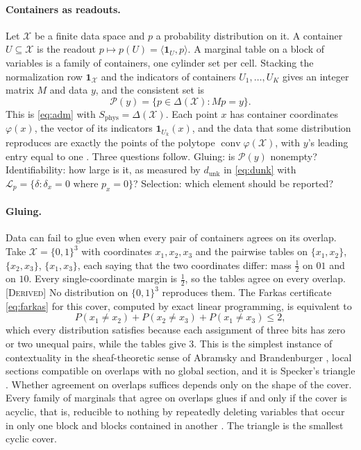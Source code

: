 \documentclass[11pt]{article}
\theoremstyle{boldplain}
\theoremstyle{boldupright}
\newcommand{\derived}{[\textup{\textsc{Derived}}]}
\newcommand{\Xs}{\mathcal{X}}
\newcommand{\Pc}{\mathcal{P}}
\newcommand{\one}{\mathbf{1}}
\newcommand{\dunk}{d_{\mathrm{unk}}}
\newcommand{\Sphys}{S_{\mathrm{phys}}}
\begin{document}
\paragraph{Containers as readouts.} Let $\Xs$ be a finite data space and $p$ a probability distribution on it. A
container $U\subseteq\Xs$ is the readout $p\mapsto p(U)=\langle\one_U,p\rangle$. A marginal table on a block of variables is a family
of containers, one cylinder set per cell. Stacking the normalization row $\one_{\Xs}$ and the indicators of containers
$U_1,\dots,U_K$ gives an integer matrix $M$ and data $y$, and the consistent set is
\begin{equation}\label{eq:fiber}
\Pc(y)=\{p\in\Delta(\Xs):Mp=y\}.
\end{equation}
This is \eqref{eq:adm} with $\Sphys=\Delta(\Xs)$. Each point $x$ has container coordinates $\varphi(x)$, the vector of its
indicators $\one_{U_k}(x)$, and the data that some distribution reproduces are exactly the points of the polytope $\operatorname{conv}\varphi(\Xs)$, with
$y$'s leading entry equal to one \cite{wainwright2008}. Three questions follow. Gluing: is $\Pc(y)$ nonempty? Identifiability:
how large is it, as measured by $\dunk$ in \eqref{eq:dunk} with $\mathcal{L}_p=\{\delta:\delta_x=0\text{ where }p_x=0\}$? Selection: which element
should be reported?

\paragraph{Gluing.} Data can fail to glue even when every pair of containers agrees on its overlap. Take
$\Xs=\{0,1\}^3$ with coordinates $x_1,x_2,x_3$ and the pairwise tables on $\{x_1,x_2\}$, $\{x_2,x_3\}$, $\{x_1,x_3\}$, each saying
that the two coordinates differ: mass $\tfrac12$ on $01$ and on $10$. Every single-coordinate margin is $\tfrac12$, so the
tables agree on every overlap. \derived{} No distribution on $\{0,1\}^3$ reproduces them. The Farkas
certificate \eqref{eq:farkas} for this cover, computed by exact linear programming, is equivalent to
\begin{equation}\label{eq:bell}
P(x_1\neq x_2)+P(x_2\neq x_3)+P(x_1\neq x_3)\le2,
\end{equation}
which every distribution satisfies because each assignment of three bits has zero or two unequal
pairs, while the tables give $3$. This is the simplest instance of contextuality in the sheaf-theoretic
sense of Abramsky and Brandenburger \cite{abramsky2011}, local sections compatible on overlaps with no global
section, and it is Specker's triangle \cite{liang2011}. Whether agreement on overlaps suffices depends only on the
shape of the cover. Every family of marginals that agree on overlaps glues if and only if the cover is
acyclic, that is, reducible to nothing by repeatedly deleting variables that occur in only one block and
blocks contained in another \cite{vorobev1962,beeri1983}. The triangle is the smallest cyclic cover.
\end{document}
